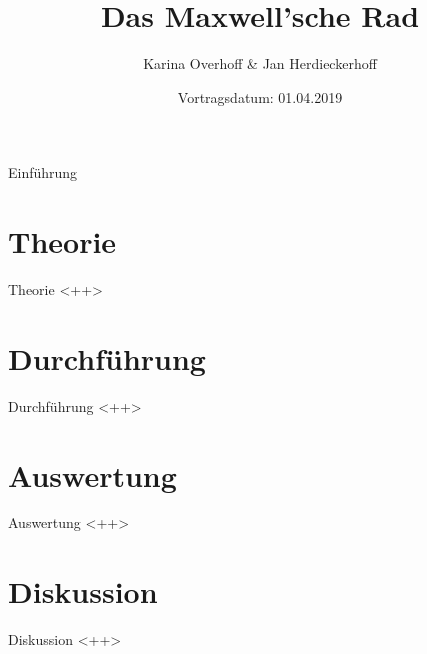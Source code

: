 \documentclass[aspectratio=1610, 9pt]{beamer}
\title{Das Maxwell'sche Rad}
\date{Vortragsdatum: 01.04.2019}
\author{
   Karina Overhoff \&
  Jan Herdieckerhoff 
}
\begin{document}
\maketitle

\begin{frame}{Einführung}
  \tableofcontents
\end{frame}

\section{Theorie}
\begin{frame}{Theorie}
    <++>
\end{frame}

\section{Durchführung}
\begin{frame}{Durchführung}
    <++>
\end{frame}

\section{Auswertung}
\begin{frame}{Auswertung}
    <++>
\end{frame}

\section{Diskussion}
\begin{frame}{Diskussion}
    <++>
\end{frame}
\end{document}
